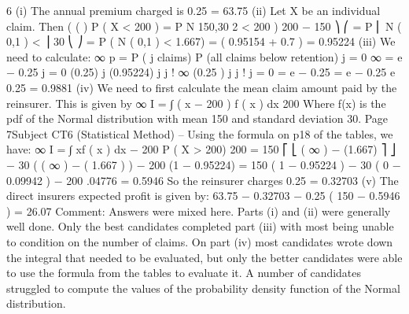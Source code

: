 

6
(i) The annual premium charged is 0.25   = 63.75
(ii) Let X be an individual claim. Then
( (
)
P ( X < 200 ) = P N 150,30 2 < 200
)
200 − 150 ⎞
⎛
= P ⎜ N ( 0,1 ) <
⎟
30
⎝
⎠
= P ( N ( 0,1 ) < 1.667)
= ( 0.95154  + 0.7  )
= 0.95224
(iii)
We need to calculate:
∞
p = \sum  P ( j claims) \times  P (all claims below retention) 
j = 0
∞
= \sum  e
− 0.25
j = 0
(0.25) j
\times  (0.95224) j
j !
∞
(0.25 ) j
j !
j = 0
= e − 0.25 \times  \sum 
= e − 0.25 \times  e 0.25 
= 0.9881
(iv)
We need to first calculate the mean claim amount paid by the reinsurer. This
is given by
∞
I =
∫ ( x − 200 ) f ( x ) dx
200
Where f(x) is the pdf of the Normal distribution with mean 150 and standard
deviation 30.
Page 7Subject CT6 (Statistical Method) – %
Using the formula on p18 of the tables, we have:
∞
I =
∫ xf ( x ) dx − 200 P ( X > 200)
200
= 150 \times  ⎡ ⎣ \Phi ( ∞ ) − \Phi(1.667) ⎤ ⎦ − 30 \times  ( \Phi ( ∞ ) − \Phi ( 1.667 ) ) − 200 \times  (1 − 0.95224)
= 150 ( 1 − 0.95224 ) − 30 \times  ( 0 − 0.09942 ) − 200 .04776
= 0.5946
So the reinsurer charges 0.25   = 0.32703
(v)
The direct insurers expected profit is given by:
63.75 − 0.32703 − 0.25 \times  ( 150 − 0.5946 ) = 26.07
Comment: Answers were mixed here. Parts (i) and (ii) were generally well done. Only the
best candidates completed part (iii) with most being unable to condition on the number of
claims. On part (iv) most candidates wrote down the integral that needed to be evaluated,
but only the better candidates were able to use the formula from the tables to evaluate it. A
number of candidates struggled to compute the values of the probability density function of
the Normal distribution.



